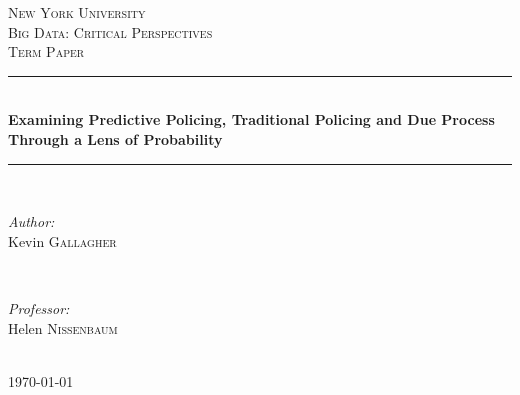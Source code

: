 \documentclass[12pt]{article} %
\begin{document}

\begin{titlepage}

\newcommand{\HRule}{\rule{\linewidth}{0.5mm}} %

\center %

\textsc{\LARGE New York University}\\[1.5cm] %
\textsc{\Large Big Data: Critical Perspectives}\\[0.5cm] %
\textsc{\large Term Paper}\\[0.5cm] %

\HRule \\[0.4cm]
{ \huge \bfseries Examining Predictive Policing, Traditional Policing and Due Process Through a Lens of Probability}\\[0.4cm] %
\HRule \\[1.5cm]

\begin{minipage}{0.4\textwidth}
\begin{flushleft} \large
\emph{Author:}\\
Kevin \textsc{Gallagher} %
\end{flushleft}
\end{minipage}
~
\begin{minipage}{0.4\textwidth}
\begin{flushright} \large
\emph{Professor:} \\
Helen \textsc{Nissenbaum} %
\end{flushright}
\end{minipage}\\[4cm]

{\large \today}\\[3cm] %


\vfill %

\end{titlepage}
\end{document}
